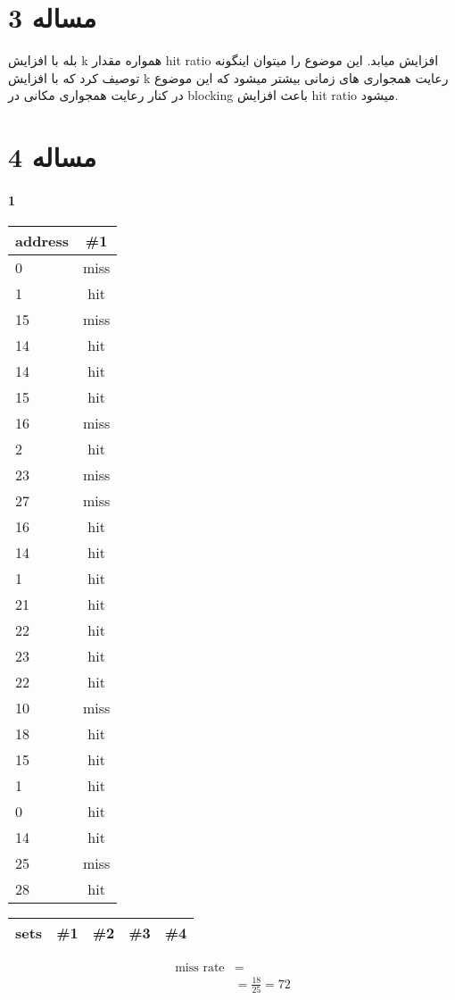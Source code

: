 \documentclass[11pt]{article}
\begin{document}
\section{مساله 3}
بله با افزایش k همواره مقدار hit ratio افزایش میابد. این موضوع را میتوان اینگونه توصیف کرد که با افزایش k رعایت همجواری های زمانی بیشتر میشود که این موضوع در کنار رعایت همجواری مکانی در blocking باعث افزایش hit ratio میشود.
\section{مساله 4}
\paragraph{1}
\begin{center}
	\begin{tabular}{l || c}
		address & \#1 \\
		\hline
		0  & miss \\
		1  & hit \\
		15 & miss \\
		14 & hit \\
		14 & hit  \\
		15 & hit  \\
		16 & miss \\
		2  & hit \\
		23 & miss \\
		27 & miss \\
		16 & hit  \\
		14 & hit  \\
		1  & hit  \\
		21 & hit \\
		22 & hit \\
		23 & hit  \\
		22 & hit  \\
		10 & miss \\
		18 & hit \\
		15 & hit \\
		1  & hit  \\
		0  & hit \\
		14 & hit \\
		25 & miss \\
		28 & hit \\
	\end{tabular}
	\begin{tabular}{l || c | c | c | c}
		sets & \#1 & \#2 & \#3 & \#4 \\
		\hline
	\end{tabular}
	\begin{align*}
		\text{miss rate} &= \\
		&= \frac{18}{25} = 72%
	\end{align*}
\end{center}
\end{document}
